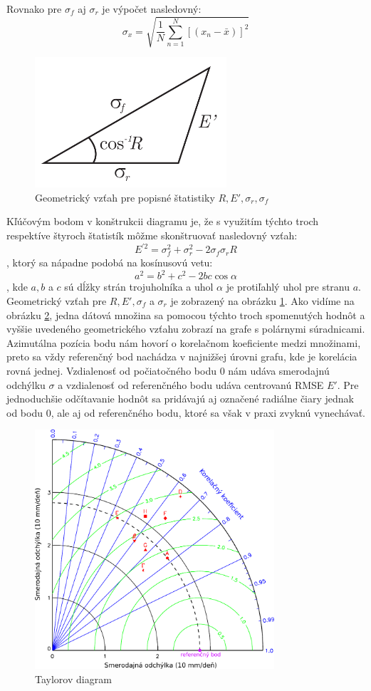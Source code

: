 Rovnako pre $ \sigma_{f} $ aj $ \sigma_{r} $ je výpočet nasledovný:
\[
\sigma_{x} = \sqrt{\frac{1}{N} \sum_{n=1}^{N}[(x_{n} - \bar{x})]^2 }
\]

\begin{figure}
	\centering
	\includegraphics[width = 2.8in]{taylortriangle}
	\caption{ Geometrický vzťah pre popisné štatistiky $ R, E', \sigma_{r}, \sigma_{f} $ }
	\label{fig:gemrelationship}
\end{figure}

Kľúčovým bodom v konštrukcii diagramu je, že s využitím týchto troch respektíve štyroch štatistík môžme skonštruovať nasledovný vzťah:
\[
	E^{\prime2} = \sigma_{f}^{2} + \sigma_{r}^{2} - 2\sigma_{f}\sigma_{r}R
\]
, ktorý sa nápadne podobá na kosínusovú vetu:
\[
	a^{2} = b^{2} + c^{2} - 2bc\cos\alpha 
\]
, kde $ a, b $ a $ c $ sú dĺžky strán trojuholníka a uhol $ \alpha $ je protiľahlý uhol pre stranu $ a $. Geometrický vzťah pre $ R, E', \sigma_{f} $ a $ \sigma_{r} $ je zobrazený na obrázku \ref{fig:gemrelationship}. Ako vidíme na obrázku \ref{fig:taylordiagram}, jedna dátová množina sa pomocou týchto troch spomenutých hodnôt a vyššie uvedeného geometrického vzťahu zobrazí na grafe s polárnymi súradnicami. Azimutálna pozícia bodu nám hovorí o korelačnom koeficiente medzi množinami, preto sa vždy referenčný bod nachádza v najnižšej úrovni grafu, kde je korelácia rovná jednej. Vzdialenosť od počiatočného bodu $ 0 $ nám udáva smerodajnú odchýlku $ \sigma $ a vzdialenosť od referenčného bodu udáva centrovanú RMSE $ E' $. Pre jednoduchšie odčítavanie hodnôt sa pridávajú aj označené radiálne čiary jednak od bodu $ 0 $, ale aj od referenčného bodu, ktoré sa však v praxi zvyknú vynechávať.

\begin{figure}
	\centering
	\includegraphics[width = 3.5in]{taylordiagram}
	\caption{ Taylorov diagram \cite{Taylor} }
	\label{fig:taylordiagram}
\end{figure}

